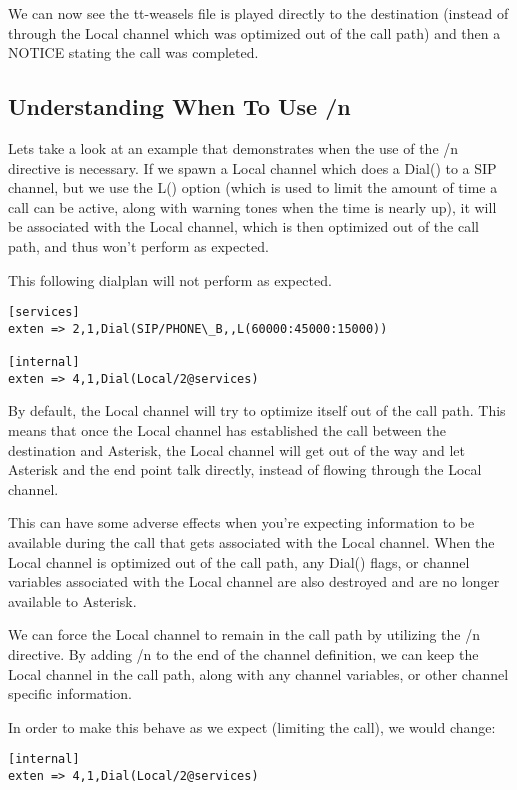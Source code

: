 We can now see the tt-weasels file is played directly to the destination
(instead of through the Local channel which was optimized out of the call path)
and then a NOTICE stating the call was completed.

\subsection{Understanding When To Use /n}

Lets take a look at an example that demonstrates when the use of the /n
directive is necessary. If we spawn a Local channel which does a Dial()
to a SIP channel, but we use the L() option (which is used to limit the
amount of time a call can be active, along with warning tones when the
time is nearly up), it will be associated with the Local channel,
which is then optimized out of the call path, and thus won't perform
as expected.

This following dialplan will not perform as expected.

\begin{verbatim}
[services]
exten => 2,1,Dial(SIP/PHONE\_B,,L(60000:45000:15000))

[internal]
exten => 4,1,Dial(Local/2@services)
\end{verbatim}

By default, the Local channel will try to optimize itself out of the call path.
This means that once the Local channel has established the call between the
destination and Asterisk, the Local channel will get out of the way and let
Asterisk and the end point talk directly, instead of flowing through the Local
channel.

This can have some adverse effects when you're expecting information to be
available during the call that gets associated with the Local channel. When the
Local channel is optimized out of the call path, any Dial() flags, or channel
variables associated with the Local channel are also destroyed and are no longer
available to Asterisk.

We can force the Local channel to remain in the call path by utilizing the /n
directive. By adding /n to the end of the channel definition, we can keep the
Local channel in the call path, along with any channel variables, or other
channel specific information.

In order to make this behave as we expect (limiting the call), we would change:

\begin{verbatim}
[internal]
exten => 4,1,Dial(Local/2@services)
\end{verbatim}

